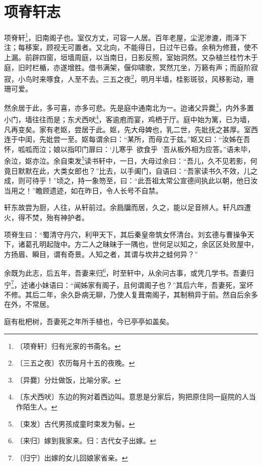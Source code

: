\documentclass[12pt,UTF-8,openany,a4]{ctexbook}
\begin{document}
\chapter{项脊轩志}

\begin{large}
    
    项脊轩\footnote{〔项脊轩〕\yiwen 归有光家的书斋名。}，旧南阁子也。室仅方丈，可容一人居。百年老屋，尘泥渗漉，雨泽下注；每移案，顾视无可置者。又北向，不能得日，日过午已昏。余稍为修葺，使不上漏。前辟四窗，垣墙周庭，以当南日，日影反照，室始洞然。又杂植兰桂竹木于庭，旧时栏楯，亦遂增胜。借书满架，偃仰啸歌，冥然兀坐，万籁有声；而庭阶寂寂，小鸟时来啄食，人至不去。三五之夜\footnote{〔三五之夜〕\yiwen 农历每月十五的夜晚。}，明月半墙，桂影斑驳，风移影动，珊珊可爱。
    
    然余居于此，多可喜，亦多可悲。先是庭中通南北为一。迨诸父异爨\footnote{〔异爨〕\yiwen 分灶做饭，比喻分家。}，内外多置小门，墙往往而是；东犬西吠\footnote{〔东犬西吠〕\yiwen 东边的狗对着西边叫。意思是分家后，狗把原住同一庭院的人当作陌生人。}，客逾庖而宴，鸡栖于厅。庭中始为篱，已为墙，凡再变矣。家有老妪，尝居于此。妪，先大母婢也，乳二世，先妣抚之甚厚。室西连于中闺，先妣尝一至。妪每谓余曰：“某所，而母立于兹。”妪又曰：“汝姊在吾怀，呱呱而泣；娘以指叩门扉曰：‘儿寒乎~欲食乎~’吾从板外相为应答。”语未毕，余泣，妪亦泣。余自束发\footnote{〔束发〕\yiwen 古代男孩成童时束发为髻。}读书轩中，一日，大母过余曰：“吾儿，久不见若影，何竟日默默在此，大类女郎也？”比去，以手阖门，自语曰：“吾家读书久不效，儿之成，则可待乎！”顷之，持一象笏至，曰：“此吾祖太常公宣德间执此以朝，他日汝当用之！”瞻顾遗迹，如在昨日，令人长号不自禁。
    
    轩东故尝为厨，人往，从轩前过。余扃牖而居，久之，能以足音辨人。轩凡四遭火，得不焚，殆有神护者。
    
    项脊生曰：“蜀清守丹穴，利甲天下，其后秦皇帝筑女怀清台。刘玄德与曹操争天下，诸葛孔明起陇中。方二人之昧昧于一隅也，世何足以知之，余区区处败屋中，方扬眉、瞬目，谓有奇景。人知之者，其谓与坎井之蛙何异？”
    
    余既为此志，后五年，吾妻来归\footnote{〔来归〕\yiwen 嫁到我家来。归：古代女子出嫁。}，时至轩中，从余问古事，或凭几学书。吾妻归宁\footnote{〔归宁〕\yiwen 出嫁的女儿回娘家省亲。}，述诸小妹语曰：“闻姊家有阁子，且何谓阁子也？”其后六年，吾妻死，室坏不修。其后二年，余久卧病无聊，乃使人复葺南阁子，其制稍异于前。然自后余多在外，不常居。
    
    庭有枇杷树，吾妻死之年所手植也，今已亭亭如盖矣。

\end{large}
\end{document}
